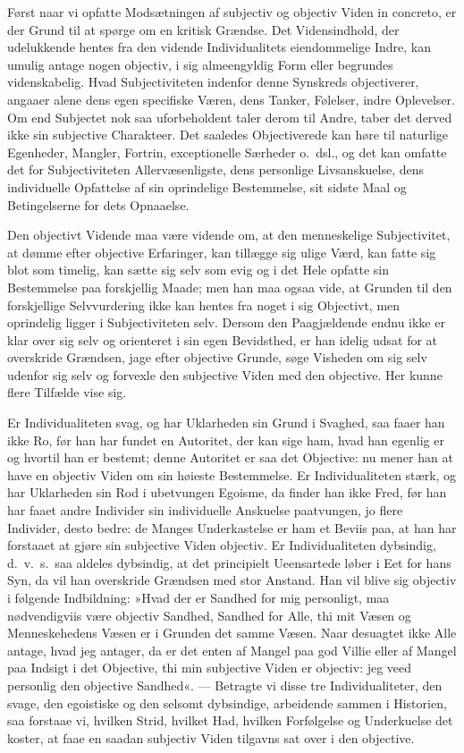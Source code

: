 \documentclass[12pt]{book}
\newcommand{\apage}[1]{\marginnote{\footnotesize\textit{[#1]}}}
\begin{document}
Først naar vi opfatte Modsætningen af subjectiv og objectiv Viden
in concreto, er der Grund til at spørge om en kritisk Grændse.
Det Vidensindhold, der udelukkende hentes fra den vidende Individualitets
eiendommelige Indre, kan umulig antage nogen objectiv, i sig almeengyldig
Form eller begrundes videnskabelig. Hvad Subjectiviteten indenfor denne
Synskreds objectiverer, \apage{42} angaaer alene dens egen specifiske Væren, dens
Tanker, Følelser, indre Oplevelser. Om end Subjectet nok saa
uforbeholdent taler derom til Andre, taber det derved ikke sin
subjective Charakteer. Det saaledes Objectiverede kan høre til
naturlige Egenheder, Mangler, Fortrin, exceptionelle Særheder o.\ dsl.,
og det kan omfatte det for Subjectiviteten Allervæsenligste, dens
personlige Livsanskuelse, dens individuelle Opfattelse af sin
oprindelige Bestemmelse, sit sidste Maal og Betingelserne for dets
Opnaaelse.

Den objectivt Vidende maa være vidende om, at den menneskelige
Subjectivitet, at dømme efter objective Erfaringer, kan tillægge sig
ulige Værd, kan fatte sig blot som timelig, kan sætte sig selv som
evig og i det Hele opfatte sin Bestemmelse paa forskjellig Maade; men
han maa ogsaa vide, at Grunden til den forskjellige Selvvurdering ikke
kan hentes fra noget i sig Objectivt, men oprindelig ligger i
Subjectiviteten selv. Dersom den Paagjældende endnu ikke er klar over
sig selv og orienteret i sin egen Bevidsthed, er han idelig udsat for
at overskride Grændsen, jage efter objective Grunde, søge Visheden om
sig selv udenfor sig selv og forvexle den subjective Viden med den
objective.
Her kunne flere Tilfælde vise sig.

Er Individualiteten svag, og har
Uklarheden sin Grund i Svaghed, saa faaer han ikke Ro, før han har
fundet en Autoritet, der kan sige ham, hvad han egenlig er og hvortil
han er bestemt; denne Autoritet er saa det Objective: nu mener han at
have en objectiv Viden om sin høieste Bestemmelse. Er  \apage{43} Individualiteten
stærk, og har Uklarheden sin Rod i ubetvungen Egoisme, da finder han
ikke Fred, før han har faaet andre Individer sin individuelle Anskuelse
paatvungen, jo flere Individer, desto bedre: de Manges Underkastelse
er ham et Beviis paa, at han har forstaaet at gjøre sin subjective
Viden objectiv. Er Individualiteten dybsindig, d.\ v.\ s.\ saa aldeles
dybsindig, at det principielt Ueensartede løber i Eet for hans Syn,
da vil han overskride Grændsen med stor Anstand. Han vil blive sig
objectiv i følgende Indbildning: »Hvad der er Sandhed for mig
personligt, maa nødvendigviis være objectiv Sandhed, Sandhed for Alle,
thi mit Væsen og Menneskehedens Væsen er i Grunden det samme Væsen.
Naar desuagtet ikke Alle antage, hvad jeg antager, da er det enten af
Mangel paa god Villie eller af Mangel paa Indsigt i det Objective, thi
min subjective Viden er objectiv: jeg veed personlig den objective
Sandhed«. --- Betragte vi disse tre Individualiteter, den svage, den
egoistiske og den selsomt dybsindige, arbeidende sammen i Historien,
saa forstaae vi, hvilken Strid, hvilket Had, hvilken Forfølgelse og
Underkuelse det koster, at faae en saadan subjectiv Viden tilgavns sat
over i den objective.
\end{document}
